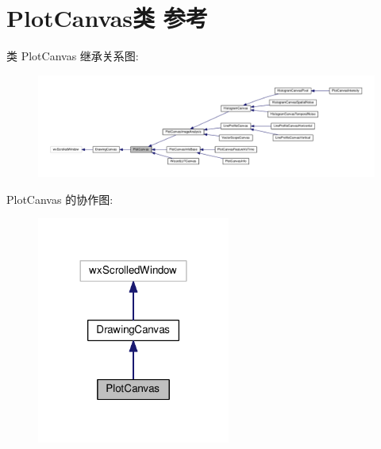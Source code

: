 \hypertarget{class_plot_canvas}{\section{Plot\+Canvas类 参考}
\label{class_plot_canvas}
}


类 Plot\+Canvas 继承关系图\+:
\nopagebreak
\begin{figure}[H]
\begin{center}
\leavevmode
\includegraphics[width=350pt]{class_plot_canvas__inherit__graph}
\end{center}
\end{figure}


Plot\+Canvas 的协作图\+:
\nopagebreak
\begin{figure}[H]
\begin{center}
\leavevmode
\includegraphics[width=180pt]{class_plot_canvas__coll__graph}
\end{center}
\end{figure}
